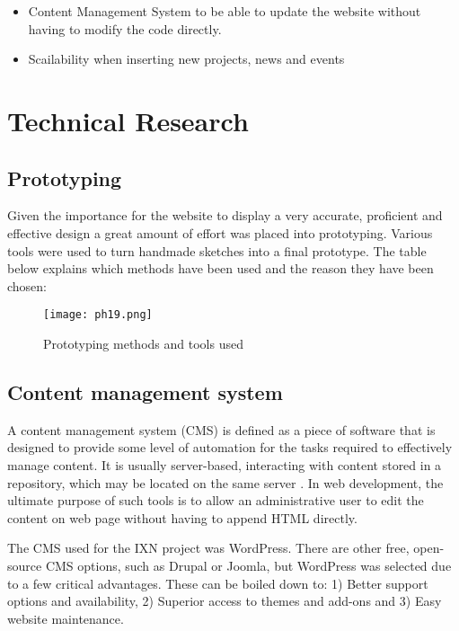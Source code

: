 \documentclass[fontsize=10pt]{extarticle}
\numberwithin{figure}{section} %
\providecommand{\tightlist}{%
  \setlength{\itemsep}{0pt}\setlength{\parskip}{0pt}}
\begin{document}
\begin{itemize}
\tightlist
\item
  Content Management System to be able to update the website without
  having to modify the code directly.
\item
  Scailability when inserting new projects, news and events
\end{itemize}

\hypertarget{technical-research}{%
\section{Technical Research}\label{technical-research}}

\hypertarget{prototyping}{%
\subsection{Prototyping}\label{prototyping}}

Given the importance for the website to display a very accurate,
proficient and effective design a great amount of effort was placed into
prototyping. Various tools were used to turn handmade sketches into a
final prototype. The table below explains which methods have been used
and the reason they have been chosen:

\begin{figure}[H]
      \centering
      \texttt{[image: ph19.png]}
      \caption{Prototyping methods and tools used}
 \end{figure}

\hypertarget{content-management-system}{%
\subsection{Content management system}\label{content-management-system}}

A content management system (CMS) is defined as a piece of software that
is designed to provide some level of automation for the tasks required
to effectively manage content. It is usually server-based, interacting
with content stored in a repository, which may be located on the same
server \cite{p1} . In web development, the ultimate purpose of such
tools is to allow an administrative user to edit the content on web page
without having to append HTML directly.

The CMS used for the IXN project was WordPress. There are other free,
open-source CMS options, such as Drupal or Joomla, but WordPress was
selected due to a few critical advantages. These can be boiled down to:
1) Better support options and availability, 2) Superior access to themes
and add-ons and 3) Easy website maintenance.~
\end{document}
